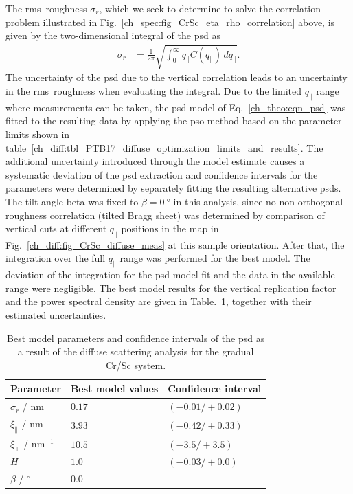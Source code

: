 The \gls{rms}~roughness $\sigma_r$, which we seek to determine to solve the correlation problem illustrated in Fig.~\ref{ch_spec:fig_CrSc_eta_rho_correlation} above, is given by the two-dimensional integral of the \gls{psd} as
\begin{align}
\sigma_r &=\frac{1}{2\pi} \sqrt{\int_{0}^{\infty} q_\parallel C(q_\parallel) \, 
dq_\parallel} \text{.}
\end{align}
The uncertainty of the \gls{psd} due to the vertical correlation leads to an 
uncertainty in the \gls{rms}~roughness when evaluating the integral. Due to the 
limited $q_\parallel$ range where measurements can be taken, the 
\gls{psd} model of Eq.~\eqref{ch_theo:eqn_psd} was fitted to the resulting data by applying the \gls{pso} method based on the parameter limits shown in table~\ref{ch_diff:tbl_PTB17_diffuse_optimization_limits_and_results}. The additional uncertainty introduced through the model estimate causes a systematic deviation of the \gls{psd} extraction and confidence intervals for the parameters were determined by separately fitting the resulting alternative \gls{psd}s. The tilt angle beta was fixed to $\beta=\SI{0}{\degree}$ in this analysis, since no non-orthogonal roughness correlation (tilted Bragg sheet) was determined by comparison of vertical cuts at different $q_\parallel$ positions in the map in Fig.~\ref{ch_diff:fig_CrSc_diffuse_meas} at this sample orientation. After that, the integration over the full $q_\parallel$ range was performed for the best model. The deviation of the integration for the \gls{psd} model fit and the data in the available range were negligible. The best model results for the vertical replication factor and the power spectral 
density are given in Table.~\ref{ch_diff:tbl_CrSc_psd_results}, together with their estimated
uncertainties.
\begin{table}
\centering
\caption{Best model parameters and confidence intervals of the \gls{psd} as a result of the diffuse scattering analysis for the gradual Cr/Sc system.}
\label{ch_diff:tbl_CrSc_psd_results}
\begin{tabular}{@{}lll@{}}
\toprule
Parameter & Best model values & Confidence interval\\ \midrule
$\sigma_r$ / nm & $0.17  $&$(-0.01/+0.02)$ \\
$\xi_\parallel$ / nm& $3.93 $&$(-0.42 / +0.33)$ \\
$\xi_\perp$  / nm$^{-1}$& $10.5 $&$ (-3.5/+3.5)$ \\
$H$ & $1.0$ & $(-0.03 /+0.0)$ \\
$\beta$ / $^\circ$ & $0.0$ & - \\
 \bottomrule
\end{tabular}
\end{table}

